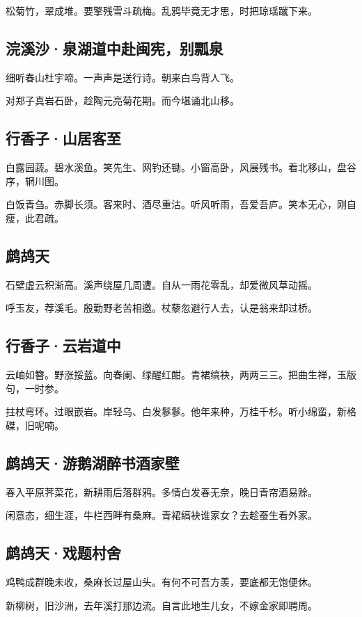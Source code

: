 \documentclass[a5paper]{ctexart}
\begin{document}
	松菊竹，翠成堆。要擎残雪斗疏梅。乱鸦毕竟无才思，时把琼瑶蹴下来。
	
	\subsection{浣溪沙·泉湖道中赴闽宪，别瓢泉}
	细听春山杜宇啼。一声声是送行诗。朝来白鸟背人飞。
	
	对郑子真岩石卧，趁陶元亮菊花期。而今堪诵北山移。
	
	\subsection{行香子·山居客至}
	白露园蔬。碧水溪鱼。笑先生、网钓还锄。小窗高卧，风展残书。看北移山，盘谷序，辋川图。
	
	白饭青刍。赤脚长须。客来时、酒尽重沽。听风听雨，吾爱吾庐。笑本无心，刚自瘦，此君疏。
	
	\subsection{鹧鸪天}
	石壁虚云积渐高。溪声绕屋几周遭。自从一雨花零乱，却爱微风草动摇。
	
	呼玉友，荐溪毛。殷勤野老苦相邀。杖藜忽避行人去，认是翁来却过桥。
	
	\subsection{行香子·云岩道中}
	云岫如簪。野涨挼蓝。向春阑、绿醒红酣。青裙缟袂，两两三三。把曲生禅，玉版句，一时参。
	
	拄杖弯环。过眼嵌岩。岸轻乌、白发鬖鬖。他年来种，万桂千杉。听小绵蛮，新格磔，旧呢喃。
	
	
	\subsection{鹧鸪天·游鹅湖醉书酒家壁}
	春入平原荠菜花，新耕雨后落群鸦。多情白发春无奈，晚日青帘酒易赊。
	
	闲意态，细生涯，牛栏西畔有桑麻。青裙缟袂谁家女？去趁蚕生看外家。
	
	\subsection{鹧鸪天·戏题村舍}
	鸡鸭成群晚未收，桑麻长过屋山头。有何不可吾方羡，要底都无饱便休。
	
	新柳树，旧沙洲，去年溪打那边流。自言此地生儿女，不嫁金家即聘周。
	
\end{document}
